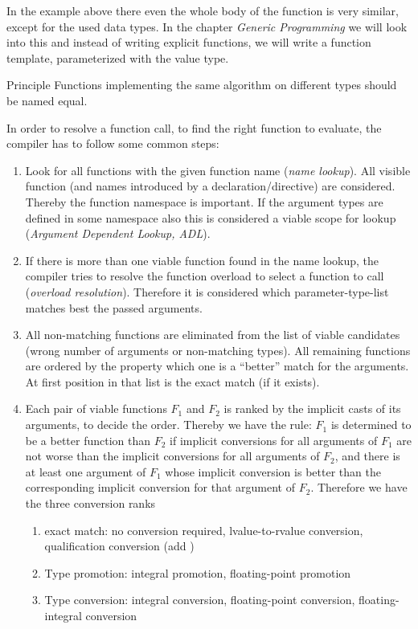 \begin{rem}
  In the example above there even the whole body of the function is very similar, except for the used data types. In the chapter \emph{Generic Programming}
  we will look into this and instead of writing explicit functions, we will write a function template, parameterized with the value type.
\end{rem}

\begin{guideline}{Principle}
  Functions implementing the same algorithm on different types should be named equal.
\end{guideline}

In order to resolve a function call, \ie to find the right function to evaluate, the compiler has to follow some common steps:
\begin{enumerate}
  \item Look for all functions with the given function name (\emph{name lookup}). All visible function (and names introduced by a 
        declaration/directive) are considered. Thereby the function namespace is important. If the argument types are defined in some namespace also this
        is considered a viable scope for lookup (\emph{Argument Dependent Lookup, ADL}).
  \item If there is more than one viable function found in the name lookup, the compiler tries to resolve the function overload to select a
        function to call (\emph{overload resolution}). Therefore it is considered which parameter-type-list matches best the passed arguments.
  \item All non-matching functions are eliminated from the list of viable candidates (\eg wrong number of arguments or non-matching types). All
        remaining functions are ordered by the property which one is a ``better'' match for the arguments. At first position in that list is the exact
        match (if it exists).
  \item Each pair of viable functions $F_1$ and $F_2$ is ranked by the implicit casts of its arguments, to decide the order. Thereby we have the rule:
        $F_1$ is determined to be a better function than $F_2$ if implicit conversions for all arguments of $F_1$ are not worse than the implicit
        conversions for all arguments of $F_2$, and there is at least one argument of $F_1$ whose implicit conversion is better than the corresponding
        implicit conversion for that argument of $F_2$. Therefore we have the three conversion ranks
        \begin{enumerate}
          \item exact match: no conversion required, lvalue-to-rvalue conversion, qualification conversion (\eg add )
          \item Type promotion: integral promotion, floating-point promotion
          \item Type conversion: integral conversion, floating-point conversion, floating-integral conversion
        \end{enumerate}
\end{enumerate}

